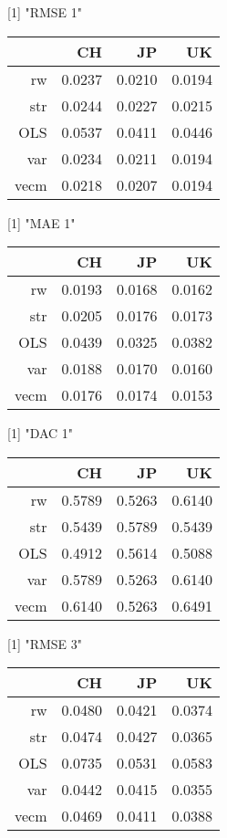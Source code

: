 [1] "RMSE 1"
\begin{table}[ht]
\centering
\begin{tabular}{rrrr}
  \hline
 & CH & JP & UK \\ 
  \hline
rw & 0.0237 & 0.0210 & 0.0194 \\ 
  str & 0.0244 & 0.0227 & 0.0215 \\ 
  OLS & 0.0537 & 0.0411 & 0.0446 \\ 
  var & 0.0234 & 0.0211 & 0.0194 \\ 
  vecm & 0.0218 & 0.0207 & 0.0194 \\ 
   \hline
\end{tabular}
\end{table}
[1] "MAE 1"
\begin{table}[ht]
\centering
\begin{tabular}{rrrr}
  \hline
 & CH & JP & UK \\ 
  \hline
rw & 0.0193 & 0.0168 & 0.0162 \\ 
  str & 0.0205 & 0.0176 & 0.0173 \\ 
  OLS & 0.0439 & 0.0325 & 0.0382 \\ 
  var & 0.0188 & 0.0170 & 0.0160 \\ 
  vecm & 0.0176 & 0.0174 & 0.0153 \\ 
   \hline
\end{tabular}
\end{table}
[1] "DAC 1"
\begin{table}[ht]
\centering
\begin{tabular}{rrrr}
  \hline
 & CH & JP & UK \\ 
  \hline
rw & 0.5789 & 0.5263 & 0.6140 \\ 
  str & 0.5439 & 0.5789 & 0.5439 \\ 
  OLS & 0.4912 & 0.5614 & 0.5088 \\ 
  var & 0.5789 & 0.5263 & 0.6140 \\ 
  vecm & 0.6140 & 0.5263 & 0.6491 \\ 
   \hline
\end{tabular}
\end{table}
[1] "RMSE 3"
\begin{table}[ht]
\centering
\begin{tabular}{rrrr}
  \hline
 & CH & JP & UK \\ 
  \hline
rw & 0.0480 & 0.0421 & 0.0374 \\ 
  str & 0.0474 & 0.0427 & 0.0365 \\ 
  OLS & 0.0735 & 0.0531 & 0.0583 \\ 
  var & 0.0442 & 0.0415 & 0.0355 \\ 
  vecm & 0.0469 & 0.0411 & 0.0388 \\ 
   \hline
\end{tabular}
\end{table}
